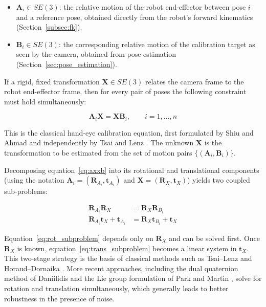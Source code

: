 \begin{itemize}
    \item $\mathbf{A}_i \in SE(3)$: the relative motion of the robot end-effector
    between pose $i$ and a reference pose, obtained directly from the robot's
    forward kinematics (Section~\ref{subsec:fk}).
    \item $\mathbf{B}_i \in SE(3)$: the corresponding relative motion of the
    calibration target as seen by the camera, obtained from pose estimation
    (Section~\ref{sec:pose_estimation}).
\end{itemize}

If a rigid, fixed transformation $\mathbf{X} \in SE(3)$ relates the camera frame
to the robot end-effector frame, then for every pair of poses the following
constraint must hold simultaneously:

\begin{equation}
    \mathbf{A}_i \mathbf{X} = \mathbf{X} \mathbf{B}_i,
    \qquad i = 1, \dots, n
    \label{eq:axxb}
\end{equation}

\noindent This is the classical hand-eye calibration equation, first formulated
by Shiu and Ahmad \cite{shiu1989calibration} and independently by Tsai and Lenz
\cite{tsai1989new}. The unknown $\mathbf{X}$ is the transformation to be
estimated from the set of motion pairs $\{(\mathbf{A}_i, \mathbf{B}_i)\}$.

Decomposing equation~\eqref{eq:axxb} into its rotational and translational
components (using the notation $\mathbf{A}_i = (\mathbf{R}_{A_i}, \mathbf{t}_{A_i})$
and $\mathbf{X} = (\mathbf{R}_X, \mathbf{t}_X)$) yields two coupled sub-problems:

\begin{align}
    \mathbf{R}_{A_i} \mathbf{R}_X &= \mathbf{R}_X \mathbf{R}_{B_i}
    \label{eq:rot_subproblem} \\
    \mathbf{R}_{A_i} \mathbf{t}_X + \mathbf{t}_{A_i}
    &= \mathbf{R}_X \mathbf{t}_{B_i} + \mathbf{t}_X
    \label{eq:trans_subproblem}
\end{align}

\noindent Equation~\eqref{eq:rot_subproblem} depends only on $\mathbf{R}_X$ and
can be solved first. Once $\mathbf{R}_X$ is known, equation~\eqref{eq:trans_subproblem}
becomes a linear system in $\mathbf{t}_X$. This two-stage strategy is the basis
of classical methods such as Tsai--Lenz \cite{tsai1989new} and Horaud--Dornaika
\cite{horaud1995hand}. More recent approaches, including the dual quaternion method
of Daniilidis \cite{daniilidis1999hand} and the Lie group formulation of Park and
Martin \cite{park1994robot}, solve for rotation and translation simultaneously,
which generally leads to better robustness in the presence of noise.

